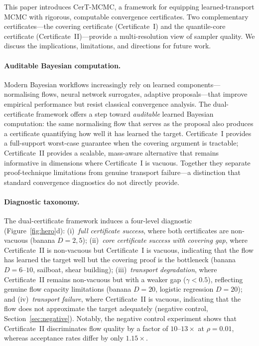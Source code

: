 \documentclass[12pt]{article}
\begin{document}
This paper introduces CerT-MCMC, a framework for equipping learned-transport MCMC with rigorous, computable convergence certificates.
Two complementary certificates---the covering certificate (Certificate~I) and the quantile-core certificate (Certificate~II)---provide a multi-resolution view of sampler quality.
We discuss the implications, limitations, and directions for future work.

\paragraph{Auditable Bayesian computation.}
Modern Bayesian workflows increasingly rely on learned components---normalising flows, neural network surrogates, adaptive proposals---that improve empirical performance but resist classical convergence analysis.
The dual-certificate framework offers a step toward \emph{auditable} learned Bayesian computation: the same normalising flow that serves as the proposal also produces a certificate quantifying how well it has learned the target.
Certificate~I provides a full-support worst-case guarantee when the covering argument is tractable; Certificate~II provides a scalable, mass-aware alternative that remains informative in dimensions where Certificate~I is vacuous.
Together they separate proof-technique limitations from genuine transport failure---a distinction that standard convergence diagnostics do not directly provide.

\paragraph{Diagnostic taxonomy.}
The dual-certificate framework induces a four-level diagnostic (Figure~\ref{fig:hero}d):
(i)~\emph{full certificate success}, where both certificates are non-vacuous (banana $D = 2, 5$);
(ii)~\emph{core certificate success with covering gap}, where Certificate~II is non-vacuous but Certificate~I is vacuous, indicating that the flow has learned the target well but the covering proof is the bottleneck (banana $D = 6$--$10$, sailboat, shear building);
(iii)~\emph{transport degradation}, where Certificate~II remains non-vacuous but with a weaker gap ($\gamma < 0.5$), reflecting genuine flow capacity limitations (banana $D = 20$, logistic regression $D = 20$);
and (iv)~\emph{transport failure}, where Certificate~II is vacuous, indicating that the flow does not approximate the target adequately (negative control, Section~\ref{sec:negative}).
Notably, the negative control experiment shows that Certificate~II discriminates flow quality by a factor of $10$--$13\times$ at $\rho = 0.01$, whereas acceptance rates differ by only $1.15\times$.
\end{document}
